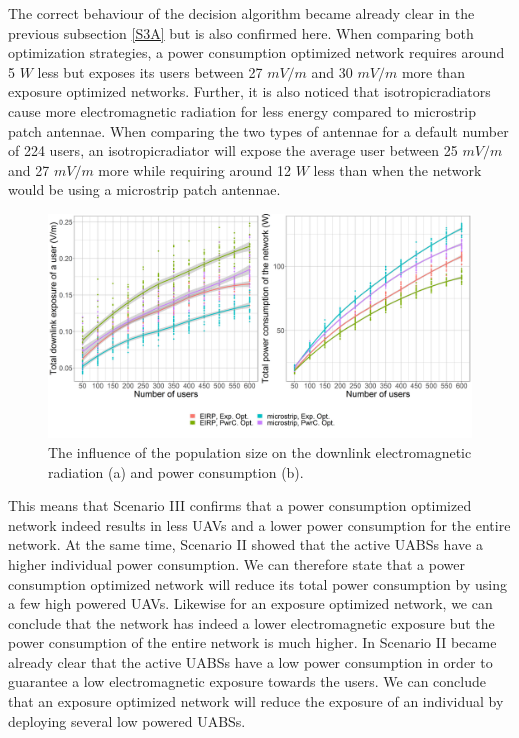 The correct behaviour of the decision algorithm became already clear in the previous subsection \ref{S3A} but is also
confirmed here. 
When comparing both optimization strategies, a power consumption optimized network requires around 5 $W$ less but exposes its users between 27 $mV/m$ and 30 $mV/m$ more than
exposure optimized networks. 
Further, it is also noticed that \gls{isotropicradiator}s cause more electromagnetic radiation for less energy
compared to microstrip patch antennae. 
When comparing the two types of antennae for a default number of 224 users, 
an \gls{isotropicradiator} will expose the average user 
between 25 $mV/m$ and 27 $mV/m$ more while requiring around 12 $W$ less than when the network would be using a microstrip patch antennae.


\begin{figure}[h!]
  \includegraphics[width=\textwidth]{../results/s3/uvsdlAndPc.png}
  \caption{The influence of the population size on the downlink electromagnetic radiation (a) and power consumption (b).}
  \label{fig:s3b_dlAndPC}
\end{figure}
This means that Scenario III confirms that a power consumption optimized network indeed results in less \gls{UAV}s and a lower 
 power consumption for the entire network. 
At the same time, Scenario II showed that the active \gls{UABS}s have a higher individual power consumption.
We can therefore state that a power consumption optimized network will reduce its total power consumption by
using a few high powered \gls{UAV}s.
Likewise for an exposure optimized network, we can conclude that the network has indeed a lower electromagnetic exposure but the power consumption 
of the entire network is much higher. In Scenario II became already clear that the active \gls{UABS}s have a low power consumption in order to 
guarantee a low electromagnetic exposure towards the users.
We can conclude that an exposure optimized network will reduce the exposure of an individual 
by deploying several low powered \gls{UABS}s.

